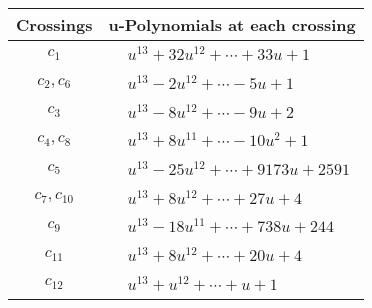 \documentclass[1p]{elsarticle_modified}
\theoremstyle{definition}
\begin{document}
\begin{tabular}{m{50pt}|m{274pt}}
Crossings & \hspace{64pt}u-Polynomials at each crossing \\
\hline $$\begin{aligned}c_{1}\end{aligned}$$&$\begin{aligned}
&u^{13}+32 u^{12}+\cdots+33 u+1
\end{aligned}$\\
\hline $$\begin{aligned}c_{2},c_{6}\end{aligned}$$&$\begin{aligned}
&u^{13}-2 u^{12}+\cdots-5 u+1
\end{aligned}$\\
\hline $$\begin{aligned}c_{3}\end{aligned}$$&$\begin{aligned}
&u^{13}-8 u^{12}+\cdots-9 u+2
\end{aligned}$\\
\hline $$\begin{aligned}c_{4},c_{8}\end{aligned}$$&$\begin{aligned}
&u^{13}+8 u^{11}+\cdots-10 u^2+1
\end{aligned}$\\
\hline $$\begin{aligned}c_{5}\end{aligned}$$&$\begin{aligned}
&u^{13}-25 u^{12}+\cdots+9173 u+2591
\end{aligned}$\\
\hline $$\begin{aligned}c_{7},c_{10}\end{aligned}$$&$\begin{aligned}
&u^{13}+8 u^{12}+\cdots+27 u+4
\end{aligned}$\\
\hline $$\begin{aligned}c_{9}\end{aligned}$$&$\begin{aligned}
&u^{13}-18 u^{11}+\cdots+738 u+244
\end{aligned}$\\
\hline $$\begin{aligned}c_{11}\end{aligned}$$&$\begin{aligned}
&u^{13}+8 u^{12}+\cdots+20 u+4
\end{aligned}$\\
\hline $$\begin{aligned}c_{12}\end{aligned}$$&$\begin{aligned}
&u^{13}+u^{12}+\cdots+u+1
\end{aligned}$\\
\hline
\end{tabular}\\~\\
\end{document}
